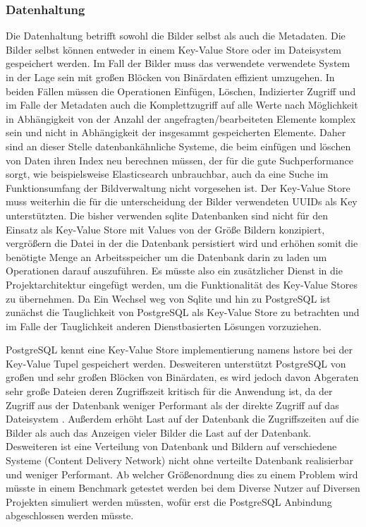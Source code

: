 \todo{}

\subsubsection{Datenhaltung}

Die Datenhaltung betrifft sowohl die Bilder selbst als auch die Metadaten. Die
Bilder selbst können entweder in einem Key-Value Store oder im Dateisystem
gespeichert werden. Im Fall der Bilder muss das verwendete verwendete System in
der Lage sein mit großen Blöcken von Binärdaten effizient umzugehen. In
beiden Fällen müssen die Operationen Einfügen, Löschen, Indizierter Zugriff und
im Falle der Metadaten auch die Komplettzugriff auf alle Werte nach Möglichkeit
in Abhängigkeit von der Anzahl der angefragten/bearbeiteten Elemente komplex
sein und nicht in Abhängigkeit der insgesammt gespeicherten Elemente. Daher sind
an dieser Stelle datenbankähnliche Systeme, die beim einfügen und löschen von
Daten ihren Index neu berechnen müssen, der für die gute Suchperformance sorgt,
wie beispielsweise Elasticsearch unbrauchbar, auch da eine Suche im
Funktionsumfang der Bildverwaltung nicht vorgesehen ist. Der Key-Value Store
muss weiterhin die für die unterscheidung der Bilder verwendeten UUIDs als Key
unterstützten. Die bisher verwenden sqlite Datenbanken sind nicht für den
Einsatz als Key-Value Store mit Values von der Größe Bildern konzipiert,
vergrößern die Datei in der die Datenbank persistiert wird und erhöhen somit die
benötigte Menge an Arbeitsspeicher um die Datenbank darin zu laden um
Operationen darauf auszuführen. Es müsste also ein zusätzlicher Dienst in die
Projektarchitektur eingefügt werden, um die Funktionalität des Key-Value Stores
zu übernehmen. Da Ein Wechsel weg von Sqlite und hin zu PostgreSQL ist zunächst
die Tauglichkeit von PostgreSQL als Key-Value Store zu betrachten und im Falle
der Tauglichkeit anderen Dienstbasierten Lösungen vorzuziehen.

PostgreSQL kennt eine Key-Value Store implementierung namens hstore
\cite{PostgreSQL-hstore} bei der Key-Value Tupel gespeichert werden. Desweiteren
unterstützt PostgreSQL von großen und sehr großen Blöcken von Binärdaten, es
wird jedoch davon Abgeraten sehr große Dateien deren Zugriffszeit kritisch für
die Anwendung ist, da der Zugriff aus der Datenbank weniger Performant als der
direkte Zugriff auf das Dateisystem \cite{PostgreSQL-blob}. Außerdem erhöht Last
auf der Datenbank die Zugriffszeiten auf die Bilder als auch das Anzeigen vieler
Bilder die Last auf der Datenbank. Desweiteren ist eine Verteilung von Datenbank
und Bildern auf verschiedene Systeme (Content Delivery Network) nicht ohne
verteilte Datenbank realisierbar und weniger Performant. Ab welcher
Größenordnung dies zu einem Problem wird müsste in einem Benchmark getestet
werden bei dem Diverse Nutzer auf Diversen Projekten simuliert werden müssten,
wofür erst die PostgreSQL Anbindung abgeschlossen werden müsste.

